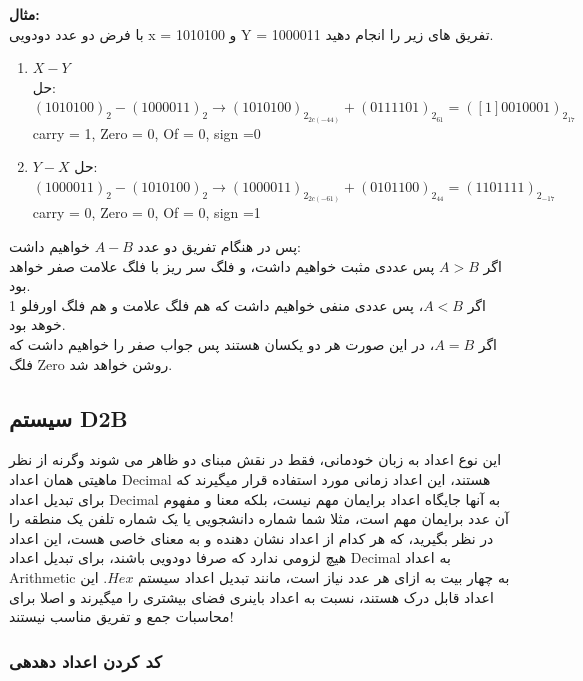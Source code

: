 \documentclass[pt, a5paper]{article}
\begin{document}
\textbf{مثال:}\\
با فرض دو عدد دودویی
x = 1010100
و
Y = 1000011
تفریق های زیر را انجام دهید.\\

\begin{enumerate}\raggedright
	\item
	$X - Y$\\
	حل:\\
	$(1010100)_{2} - (1000011)_{2} \rightarrow (1010100)_{2_{2c(-44)}} + (0111101)_{2_{61}}=([1]0010001)_{2_{17}}$\\
		carry = 1, Zero = 0, Of = 0, sign =0
	\item
	$Y - X$
	حل:\\
	$(1000011)_{2} - (1010100)_{2} \rightarrow (1000011)_{2_{2c(-61)}} + (0101100)_{2_{44}}=(1101111)_{2_{-17}}$\\
		carry = 0, Zero = 0, Of = 0, sign =1
\end{enumerate}

پس در هنگام تفریق دو عدد
$A - B$
خواهیم داشت:\\
اگر
$A > B$
پس عددی مثبت خواهیم داشت، و فلگ سر ریز با فلگ علامت صفر خواهد بود.\\
اگر
$A < B$، 
پس عددی منفی خواهیم داشت که هم فلگ علامت و هم فلگ اورفلو 1 خوهد بود.\\
اگر
$A = B$،
در این صورت هر دو یکسان هستند پس جواب صفر را خواهیم داشت که فلگ Zero روشن خواهد شد.




\subsection{سیستم D2B}
این نوع اعداد به زبان خودمانی، فقط در نقش مبنای دو ظاهر می شوند وگرنه از نظر ماهیتی همان اعداد Decimal هستند، این اعداد زمانی مورد استفاده قرار میگیرند که برای تبدیل اعداد Decimal به آنها جایگاه اعداد برایمان مهم نیست، بلکه معنا و مفهوم آن عدد برایمان مهم است، مثلا شما شماره دانشجویی یا یک شماره تلفن یک منطقه را در نظر بگیرید، که هر کدام از اعداد نشان دهنده و به معنای خاصی هست، این اعداد هیچ لزومی ندارد که صرفا دودویی باشند، برای تبدیل اعداد Decimal به اعداد Arithmetic به چهار بیت به ازای هر عدد نیاز است، مانند تبدیل اعداد سیستم ${Hex}$. این اعداد قابل درک هستند، نسبت به اعداد باینری فضای بیشتری را میگیرند و اصلا برای محاسبات جمع و تفریق مناسب نیستند!
\subsubsection{کد کردن اعداد دهدهی}
\end{document}
